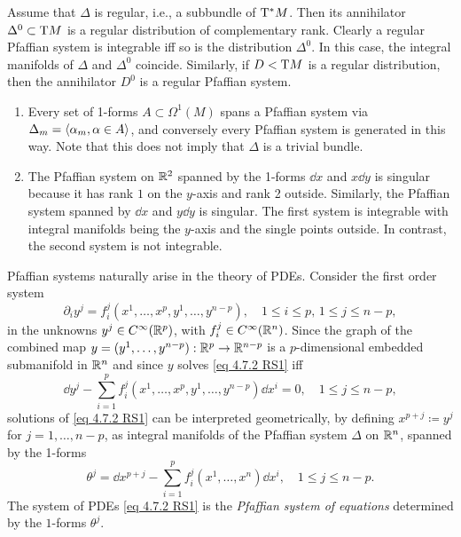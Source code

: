 \begin{rem}
    Assume that $\Delta$ is regular, i.e., a subbundle of $\mathrm{T}^\ast M$. Then its annihilator $\Delta^0\subset \mathrm{T} M$ is a regular distribution of complementary rank. Clearly a regular Pfaffian system is integrable iff so is the distribution $\Delta^0$. In this case, the integral manifolds of $\Delta$ and $\Delta^0$ coincide. Similarly, if $D< \mathrm{T} M$ is a regular distribution, then the annihilator $D^0$ is a regular Pfaffian system.
\end{rem}

\begin{example}
    \begin{enumerate}
        \item Every set of 1-forms $A\subset \Omega^1(M)$ spans a Pfaffian system via $\Delta_m=\langle\alpha_m,\alpha\in A\rangle$, and conversely every Pfaffian system is generated in this way. Note that this does not imply that $\Delta$ is a trivial bundle.
        \item The Pfaffian system on $\mathbb{R}^2$ spanned by the 1-forms $\dd x$ and $x\dd y$ is singular because it has rank $1$ on the $y$-axis and rank 2 outside. Similarly, the Pfaffian system spanned by $\dd x$ and $y\dd y$ is singular. The first system is integrable with integral manifolds being the $y$-axis and the single points outside. In contrast, the second system is not integrable.
    \end{enumerate}
\end{example}

Pfaffian systems naturally arise in the theory of PDEs. Consider the first order system
\[\partial_i y^j=f_i^j(x^1,\ldots,x^p,y^1,\ldots,y^{n-p}),\quad 1\leq i\leq p,\,1\leq j\leq n-p,\label{eq 4.7.2 RS1}\]
in the unknowns $y^j\in C^\infty(\mathbb{R}^p)$, with $f_i^j\in C^\infty(\mathbb{R}^n)$. Since the graph of the combined map $y=(y^1,\ldots,y^{n-p}):\mathbb{R}^p\to \mathbb{R}^{n-p}$ is a $p$-dimensional embedded submanifold in $\mathbb{R}^n$ and since $y$ solves \eqref{eq 4.7.2 RS1} iff
\[\dd y^j-\sum_{i=1}^p f_i^j(x^1,\ldots,x^p,y^1,\ldots,y^{n-p})\dd x^i=0,\quad 1\leq j\leq n-p,\]
solutions of \eqref{eq 4.7.2 RS1} can be interpreted geometrically, by defining $x^{p+j}\coloneqq y^j$ for $j=1,\ldots,n-p$, as integral manifolds of the Pfaffian system $\Delta$ on $\mathbb{R}^n$, spanned by the 1-forms
\[\theta^j=\dd x^{p+j}-\sum_{i=1}^p f_i^j(x^1,\ldots,x^n)\dd x^i,\quad 1\leq j\leq n-p.\]
The system of PDEs \eqref{eq 4.7.2 RS1} is the \emph{Pfaffian system of equations} determined by the $1$-forms $\theta^j$.

